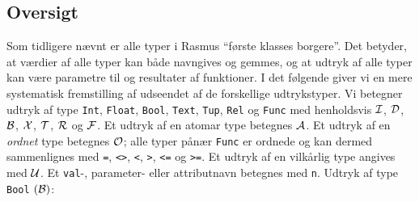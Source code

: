 \documentclass{article}
\begin{document}
\subsection{Oversigt}
Som tidligere n\ae{}vnt er alle typer i {\sc Rasmus}
``f\o{}rste klasses borgere''. Det betyder, at v\ae{}rdier af alle typer
kan b\aa{}de navngives og gemmes, og at udtryk af alle typer
kan v\ae{}re parametre til og resultater af funktioner. I det f\o{}lgende
giver vi en mere systematisk fremstilling af udseendet af de forskellige
udtrykstyper. Vi betegner udtryk af type 
\verb"Int", \verb"Float", \verb"Bool", \verb"Text", \verb"Tup", \verb"Rel"
og \verb"Func" med henholdsvis $\cal I$, $\cal D$, $\cal B$, $\cal X$, $\cal T$, 
$\cal R$ og $\cal F$. Et udtryk af en atomar type betegnes $\cal A$.
Et udtryk af en {\em ordnet\/} type betegnes $\cal O$; alle typer
p\aa{}n\ae{}r \verb"Func" er ordnede og kan dermed sammenlignes med
\verb"=", \verb"<>", \verb"<", \verb">", \verb"<=" og \verb">=".
Et udtryk af en vilk\aa{}rlig type angives med $\cal U$.
Et \verb"val"-, parameter- eller
attributnavn betegnes med \verb"n".
\newpage
Udtryk af type \verb"Bool" $(\cal B)$:
\end{document}
